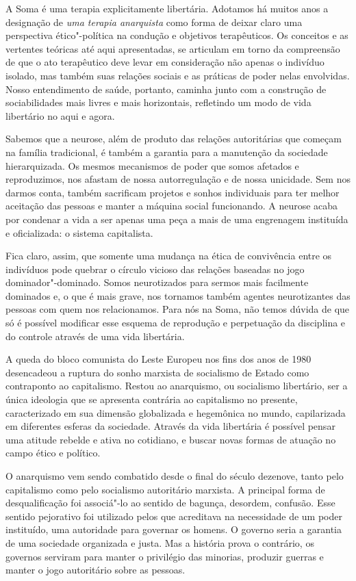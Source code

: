 A Soma é uma terapia explicitamente libertária. Adotamos há muitos anos
a designação de \emph{uma terapia anarquista} como forma de deixar claro
uma perspectiva ético"-política na condução e objetivos terapêuticos. Os
conceitos e as vertentes teóricas até aqui apresentadas, se articulam em
torno da compreensão de que o ato terapêutico deve levar em consideração
não apenas o indivíduo isolado, mas também suas relações sociais e as
práticas de poder nelas envolvidas. Nosso entendimento de saúde,
portanto, caminha junto com a construção de sociabilidades mais livres e
mais horizontais, refletindo um modo de vida libertário no aqui e agora.

Sabemos que a neurose, além de produto das relações autoritárias que
começam na família tradicional, é também a garantia para a manutenção da
sociedade hierarquizada. Os mesmos mecanismos de poder que somos
afetados e reproduzimos, nos afastam de nossa autorregulação e de nossa
unicidade. Sem nos darmos conta, também sacrificam projetos e sonhos
individuais para ter melhor aceitação das pessoas e manter a máquina
social funcionando. A neurose acaba por condenar a vida a ser apenas uma
peça a mais de uma engrenagem instituída e oficializada: o sistema
capitalista.

Fica claro, assim, que somente uma mudança na ética de convivência entre
os indivíduos pode quebrar o círculo vicioso das relações baseadas no
jogo dominador"-dominado. Somos neurotizados para sermos mais facilmente
dominados e, o que é mais grave, nos tornamos também agentes
neurotizantes das pessoas com quem nos relacionamos. Para nós na Soma,
não temos dúvida de que só é possível modificar esse esquema de
reprodução e perpetuação da disciplina e do controle através de uma vida
libertária.

A queda do bloco comunista do Leste Europeu nos fins dos anos de 1980
desencadeou a ruptura do sonho marxista de socialismo de Estado como
contraponto ao capitalismo. Restou ao anarquismo, ou socialismo
libertário, ser a única ideologia que se apresenta contrária ao
capitalismo no presente, caracterizado em sua dimensão globalizada e
hegemônica no mundo, capilarizada em diferentes esferas da sociedade.
Através da vida libertária é possível pensar uma atitude rebelde e ativa
no cotidiano, e buscar novas formas de atuação no campo ético e
político.

O anarquismo vem sendo combatido desde o final do século dezenove, tanto
pelo capitalismo como pelo socialismo autoritário marxista. A principal
forma de desqualificação foi associá"-lo ao sentido de bagunça, desordem,
confusão. Esse sentido pejorativo foi utilizado pelos que acreditava na
necessidade de um poder instituído, uma autoridade para governar os
homens. O governo seria a garantia de uma sociedade organizada e justa.
Mas a história prova o contrário, os governos serviram para manter o
privilégio das minorias, produzir guerras e manter o jogo autoritário
sobre as pessoas.

